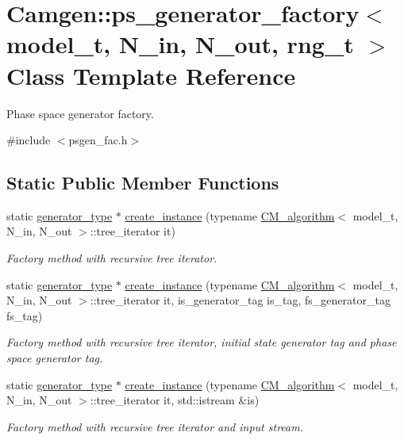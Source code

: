 \hypertarget{a00443}{\section{Camgen\-:\-:ps\-\_\-generator\-\_\-factory$<$ model\-\_\-t, N\-\_\-in, N\-\_\-out, rng\-\_\-t $>$ Class Template Reference}
\label{a00443}
}


Phase space generator factory.  




{\ttfamily \#include $<$psgen\-\_\-fac.\-h$>$}

\subsection*{Static Public Member Functions}
\begin{DoxyCompactItemize}
\item 
\hypertarget{a00443_aaa3acece9b3b8c64a6fa682aceef1850}{static \hyperlink{a00441}{generator\-\_\-type} $\ast$ \hyperlink{a00443_aaa3acece9b3b8c64a6fa682aceef1850}{create\-\_\-instance} (typename \hyperlink{a00070}{C\-M\-\_\-algorithm}$<$ model\-\_\-t, N\-\_\-in, N\-\_\-out $>$\-::tree\-\_\-iterator it)}\label{a00443_aaa3acece9b3b8c64a6fa682aceef1850}

\begin{DoxyCompactList}\small\item\em Factory method with recursive tree iterator. \end{DoxyCompactList}\item 
static \hyperlink{a00441}{generator\-\_\-type} $\ast$ \hyperlink{a00443_af0be9d5a455734523d5eb80fa4990e90}{create\-\_\-instance} (typename \hyperlink{a00070}{C\-M\-\_\-algorithm}$<$ model\-\_\-t, N\-\_\-in, N\-\_\-out $>$\-::tree\-\_\-iterator it, is\-\_\-generator\-\_\-tag is\-\_\-tag, fs\-\_\-generator\-\_\-tag fs\-\_\-tag)
\begin{DoxyCompactList}\small\item\em Factory method with recursive tree iterator, initial state generator tag and phase space generator tag. \end{DoxyCompactList}\item 
\hypertarget{a00443_a12ab4c9d7a2805823aceaf093244c7a2}{static \hyperlink{a00441}{generator\-\_\-type} $\ast$ \hyperlink{a00443_a12ab4c9d7a2805823aceaf093244c7a2}{create\-\_\-instance} (typename \hyperlink{a00070}{C\-M\-\_\-algorithm}$<$ model\-\_\-t, N\-\_\-in, N\-\_\-out $>$\-::tree\-\_\-iterator it, std\-::istream \&is)}\label{a00443_a12ab4c9d7a2805823aceaf093244c7a2}

\begin{DoxyCompactList}\small\item\em Factory method with recursive tree iterator and input stream. \end{DoxyCompactList}\end{DoxyCompactItemize}



